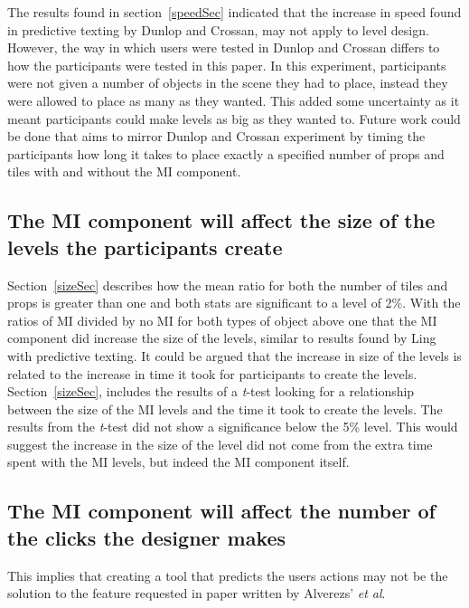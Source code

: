 \documentclass[journal]{IEEEtran}
\begin{document}
The results found in section~\ref{speedSec} indicated that the increase in speed found in predictive texting by Dunlop and Crossan\cite{dunlop2000predictive}, may not apply to level design. However, the way in which users were tested in Dunlop and Crossan\cite{dunlop2000predictive} differs to how the participants were tested in this paper. In this experiment, participants were not given a number of objects in the scene they had to place, instead they were allowed to place as many as they wanted. This added some uncertainty as it meant participants could make levels as big as they wanted to. Future work could be done that aims to mirror Dunlop and Crossan\cite{dunlop2000predictive} experiment by timing the participants how long it takes to place exactly a specified number of props and tiles with and without the MI component.

\subsection{The MI component will affect the size of the levels the participants create}
Section~\ref{sizeSec} describes how the mean ratio for both the number of tiles and props is greater than one and both stats are significant to a level of 2\%.  With the ratios of MI divided by no MI for both types of object above one that the MI component did increase the size of the levels, similar to results found by Ling \cite{ling2005length} with predictive texting. It could be argued that the increase in size of the levels is related to the increase in time it took for participants to create the levels. Section~\ref{sizeSec}, includes the results of a \textit{t}-test looking for a relationship between the size of the MI levels and the time it took to create the levels. The results from the \textit{t}-test did not show a significance below the 5\% level. This would suggest the increase in the size of the level did not come from the extra time spent with the MI levels, but indeed the MI component itself. 

\subsection{The MI component will affect the number of the clicks the designer makes}
This implies that creating a tool that predicts the users actions may not be the solution to the feature requested in paper written by Alverezs' \textit{et al}\cite{alvarez2018fostering}. 
\end{document}
